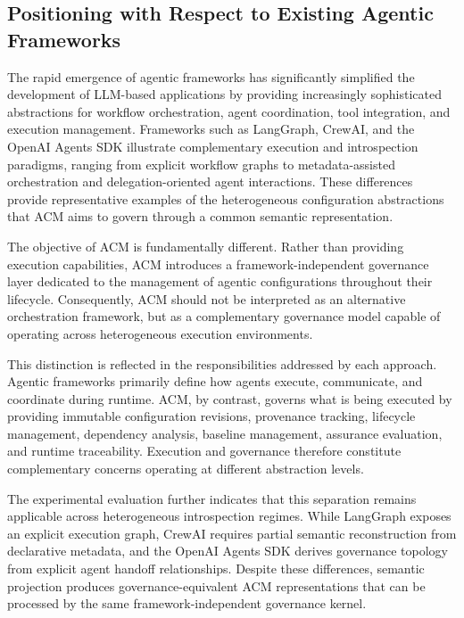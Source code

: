 \documentclass[10pt]{article}
\begin{document}
\subsection{Positioning with Respect to Existing Agentic Frameworks}
\label{sec:positioning}

The rapid emergence of agentic frameworks has significantly simplified the development of LLM-based applications by providing increasingly sophisticated abstractions for workflow orchestration, agent coordination, tool integration, and execution management. Frameworks such as LangGraph, CrewAI, and the OpenAI Agents SDK illustrate complementary execution and introspection paradigms, ranging from explicit workflow graphs to metadata-assisted orchestration and delegation-oriented agent interactions. These differences provide representative examples of the heterogeneous configuration abstractions that ACM aims to govern through a common semantic representation.

The objective of ACM is fundamentally different. Rather than providing execution capabilities, ACM introduces a framework-independent governance layer dedicated to the management of agentic configurations throughout their lifecycle. Consequently, ACM should not be interpreted as an alternative orchestration framework, but as a complementary governance model capable of operating across heterogeneous execution environments.

This distinction is reflected in the responsibilities addressed by each approach. Agentic frameworks primarily define how agents execute, communicate, and coordinate during runtime. ACM, by contrast, governs what is being executed by providing immutable configuration revisions, provenance tracking, lifecycle management, dependency analysis, baseline management, assurance evaluation, and runtime traceability. Execution and governance therefore constitute complementary concerns operating at different abstraction levels.

The experimental evaluation further indicates that this separation remains applicable across heterogeneous introspection regimes. While LangGraph exposes an explicit execution graph, CrewAI requires partial semantic reconstruction from declarative metadata, and the OpenAI Agents SDK derives governance topology from explicit agent handoff relationships. Despite these differences, semantic projection produces governance-equivalent ACM representations that can be processed by the same framework-independent governance kernel.
\end{document}
